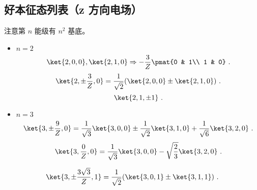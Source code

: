 
\subsection{好本征态列表（z 方向电场）}

注意第 $n$ 能级有 $n^2$ 基底。
\begin{itemize}
\item $n=2$
\begin{equation}
\ket{2,0,0},\ket{2,1,0} \Rightarrow-\frac{3}{Z}\pmat{0 & 1\\ 1 & 0}~.
\end{equation}
\begin{equation}
\ket{2,\pm\frac{3}{Z}, 0} = \frac{1}{\sqrt{2}}(\ket{2,0,0}\pm\ket{2,1,0})~.
\end{equation}
\begin{equation}
\ket{2,1,\pm 1}~.
\end{equation}
\item $n=3$
\begin{equation}
\ket{3,\pm\frac{9}{Z},0} = \frac{1}{\sqrt{3}}\ket{3,0,0} \pm \frac{1}{\sqrt{2}}\ket{3,1,0} + \frac{1}{\sqrt{6}}\ket{3,2,0}~.
\end{equation}
\begin{equation}
\ket{3,\frac{0}{Z},0} = \frac{1}{\sqrt{3}}\ket{3,0,0} - \sqrt{\frac{2}{3}}\ket{3,2,0}~.
\end{equation}
\end{itemize}
\begin{equation}
\ket{3,\pm \frac{3\sqrt{3}}{Z},1} = \frac{1}{\sqrt 2}(\ket{3,0,1}\pm\ket{3,1,1})~.
\end{equation}
